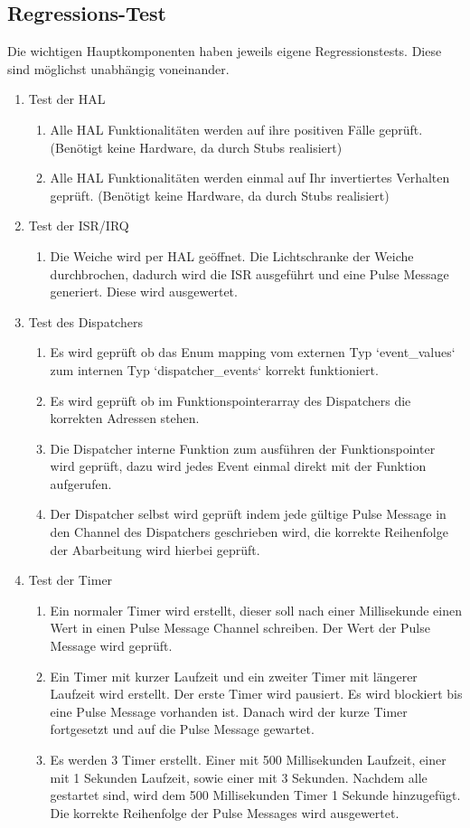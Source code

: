 \documentclass[oneside,a4paper,titlepage]{scrartcl} %
\begin{document}
\subsection{Regressions-Test}
Die wichtigen Hauptkomponenten haben jeweils eigene Regressionstests. Diese sind möglichst
unabhängig voneinander.
\begin{enumerate}
  \item Test der HAL
  \begin{enumerate}
    \item Alle HAL Funktionalitäten werden auf ihre positiven Fälle geprüft. (Benötigt keine Hardware, da durch Stubs realisiert)
    \item Alle HAL Funktionalitäten werden einmal auf Ihr invertiertes Verhalten geprüft. (Benötigt keine Hardware, da durch Stubs realisiert)
  \end{enumerate}
  \item Test der ISR/IRQ
  \begin{enumerate}
    \item Die Weiche wird per HAL geöffnet. Die Lichtschranke der Weiche durchbrochen, dadurch wird die ISR ausgeführt und eine Pulse Message generiert. Diese wird ausgewertet.
  \end{enumerate}
  \item Test des Dispatchers
  \begin{enumerate}
    \item Es wird geprüft ob das Enum mapping vom externen Typ `event\_values` zum internen Typ `dispatcher\_events` korrekt funktioniert.
    \item Es wird geprüft ob im Funktionspointerarray des Dispatchers die korrekten Adressen stehen.
    \item Die Dispatcher interne Funktion zum ausführen der Funktionspointer wird geprüft, dazu wird jedes Event einmal direkt mit der Funktion aufgerufen.
    \item Der Dispatcher selbst wird geprüft indem jede gültige Pulse Message in den Channel des Dispatchers geschrieben wird, die korrekte Reihenfolge der Abarbeitung wird hierbei geprüft.
  \end{enumerate}
  \item Test der Timer
  \begin{enumerate}
    \item Ein normaler Timer wird erstellt, dieser soll nach einer Millisekunde einen Wert in einen Pulse Message Channel schreiben. Der Wert der Pulse Message wird geprüft.
    \item Ein Timer mit kurzer Laufzeit und ein zweiter Timer mit längerer Laufzeit wird erstellt. Der erste Timer wird pausiert. Es wird blockiert bis eine Pulse Message vorhanden ist. Danach wird der kurze Timer fortgesetzt und auf die Pulse Message gewartet.
    \item Es werden 3 Timer erstellt. Einer mit 500 Millisekunden Laufzeit, einer mit 1 Sekunden Laufzeit, sowie einer mit 3 Sekunden. Nachdem alle gestartet sind, wird dem 500 Millisekunden Timer 1 Sekunde hinzugefügt. Die korrekte Reihenfolge der Pulse Messages wird ausgewertet.
  \end{enumerate}


\end{enumerate}
\end{document}
